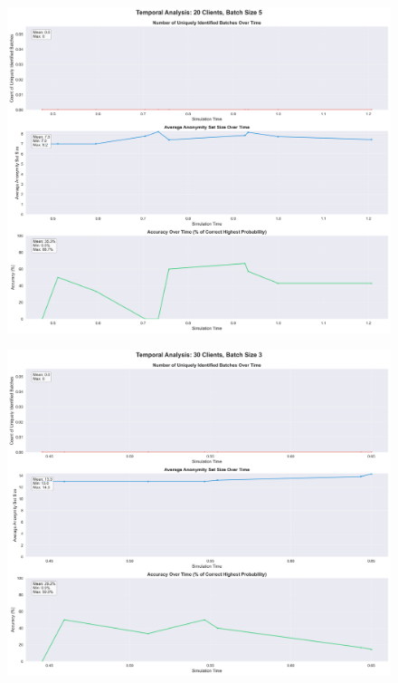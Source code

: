\documentclass[twocolumn]{article}
\begin{document}
\begin{figure}[!htb]
\centering
\includegraphics[width=\textwidth]{diagrams/temporal_analysis_20_5.png}
\label{fig:temporal_analysis_20_5}
\end{figure}

\begin{figure}[!htb]
\centering
\includegraphics[width=\textwidth]{diagrams/temporal_analysis_30_3.png}
\label{fig:temporal_analysis_30_3}
\end{figure}
\end{document}

